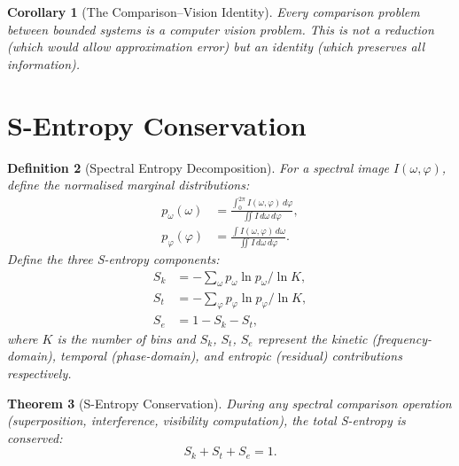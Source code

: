 \documentclass[11pt,twocolumn,a4paper]{article}
\newtheorem{theorem}{Theorem}[section]
\newtheorem{corollary}[theorem]{Corollary}
\newtheorem{definition}[theorem]{Definition}
\newcommand{\Sk}{S_k}
\newcommand{\St}{S_t}
\newcommand{\Se}{S_e}
\begin{document}
\begin{corollary}[The Comparison--Vision Identity]
\label{cor:comparison_vision}
Every comparison problem between bounded systems is a computer vision
problem. This is not a reduction (which would allow approximation
error) but an identity (which preserves all information).
\end{corollary}


\section{S-Entropy Conservation}
\label{sec:s_entropy}

\begin{definition}[Spectral Entropy Decomposition]
\label{def:s_entropy}
For a spectral image $I(\omega, \varphi)$, define the normalised
marginal distributions:
\begin{align}
  p_\omega(\omega) &= \frac{\int_0^{2\pi} I(\omega, \varphi)
    \, d\varphi}{\iint I \, d\omega \, d\varphi},
    \label{eq:p_omega} \\
  p_\varphi(\varphi) &= \frac{\int I(\omega, \varphi)
    \, d\omega}{\iint I \, d\omega \, d\varphi}.
    \label{eq:p_phi}
\end{align}
Define the three S-entropy components:
\begin{align}
  \Sk &= -\sum_\omega p_\omega \ln p_\omega \bigg/ \ln K,
    \label{eq:Sk} \\
  \St &= -\sum_\varphi p_\varphi \ln p_\varphi \bigg/ \ln K,
    \label{eq:St} \\
  \Se &= 1 - \Sk - \St,
    \label{eq:Se}
\end{align}
where $K$ is the number of bins and $\Sk$, $\St$, $\Se$ represent the
kinetic (frequency-domain), temporal (phase-domain), and entropic
(residual) contributions respectively.
\end{definition}

\begin{theorem}[S-Entropy Conservation]
\label{thm:s_conservation}
During any spectral comparison operation (superposition, interference,
visibility computation), the total S-entropy is conserved:
\begin{equation}
\label{eq:s_conservation}
  \Sk + \St + \Se = 1.
\end{equation}
\end{theorem}
\end{document}

